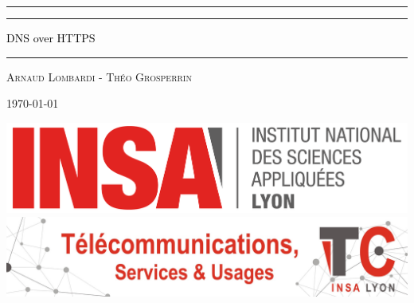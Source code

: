 \documentclass[a4paper,12pt]{article}
\begin{document}
	\pagestyle{fancy}
	\headheight=15pt
	\fancyhf{}
	\renewcommand{\footrulewidth}{0.4pt}
	
	\rfoot{\thepage}
	
	\begin{titlepage}
		
		\begin{center}
			\rule{\textwidth}{1pt} %
			
			\vspace{2pt}\vspace{-\baselineskip} %
			
			\rule{\textwidth}{0.4pt} %
			
			\vspace{0.1\textheight} %
			
			
			\textcolor{black} {
				{\Huge DNS over HTTPS}\\[0.5\baselineskip]
			}
			
			\vspace{0.01\textheight} %
			
			\rule{0.3\textwidth}{0.4pt} %
			
			\vspace{0.1\textheight}
			
			
			{\Large \textsc{Arnaud Lombardi - Théo Grosperrin}} %
			
			\vspace{0.025\textheight}
			
			{\large \textsc{\today}}
			
			\vfill %
			
		\end{center}
		
		
		\centering
		{\includegraphics[scale=0.5]{Images/INSA_LOGO.png}}\\[1.7\baselineskip]
		{\includegraphics[scale=0.18]{Images/TC.jpg}}
		

\end{titlepage}
\end{document}
